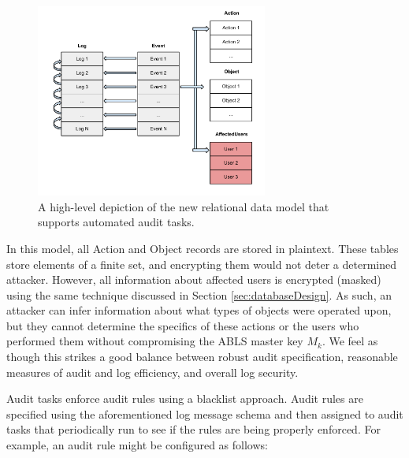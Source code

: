 \documentclass{sig-alternate}
\begin{document}
\begin{figure}[ht!]
\begin{center}
\includegraphics[width=3in]{images/relational_design_v2.pdf}
\caption{A high-level depiction of the new relational data model that supports automated audit tasks.}
\label{fig:design2}
\end{center}
\end{figure}

In this model, all Action and Object records are stored in plaintext. These tables store elements of a finite set, and
encrypting them would not deter a determined attacker. However, all information about affected users is encrypted 
(masked) using the same technique discussed in Section \ref{sec:databaseDesign}. As such, an attacker can infer
information about what types of objects were operated upon, but they cannot determine the specifics of these actions
or the users who performed them without compromising the ABLS master key $M_k$. We feel as though this strikes
a good balance between robust audit specification, reasonable measures of audit and log efficiency, and overall 
log security. 

Audit tasks enforce audit rules using a blacklist approach. Audit rules are specified using the aforementioned 
log message schema and then assigned to audit tasks that periodically run to see if the rules are being properly enforced.
For example, an audit rule might be configured as follows:



\end{document}

